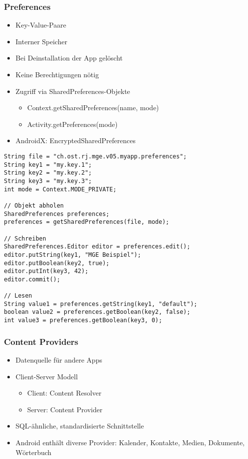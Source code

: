 \subsubsection{Preferences}
\begin{itemize}[topsep=0pt, leftmargin=4mm]
    \setlength\itemsep{-0.3em}
    \item Key-Value-Paare
    \item Interner Speicher
    \item Bei Deinstallation der App gelöscht
    \item Keine Berechtigungen nötig
    \item Zugriff via SharedPreferences-Objekte
    \begin{itemize}[topsep=0pt, leftmargin=4mm]
        \setlength\itemsep{-0.3em}
        \item Context.getSharedPreferences(name, mode)
        \item Activity.getPreferences(mode)
    \end{itemize}
    \item AndroidX: EncryptedSharedPreferences
\end{itemize}
\begin{lstlisting}
String file = "ch.ost.rj.mge.v05.myapp.preferences";
String key1 = "my.key.1";
String key2 = "my.key.2";
String key3 = "my.key.3";
int mode = Context.MODE_PRIVATE;

// Objekt abholen
SharedPreferences preferences;
preferences = getSharedPreferences(file, mode);

// Schreiben
SharedPreferences.Editor editor = preferences.edit();
editor.putString(key1, "MGE Beispiel");
editor.putBoolean(key2, true);
editor.putInt(key3, 42);
editor.commit();

// Lesen
String value1 = preferences.getString(key1, "default");
boolean value2 = preferences.getBoolean(key2, false);
int value3 = preferences.getBoolean(key3, 0);
\end{lstlisting}
\subsubsection{Content Providers}
\begin{itemize}[topsep=0pt, leftmargin=4mm]
    \setlength\itemsep{-0.3em}
    \item Datenquelle für andere Apps
    \item Client-Server Modell
    \begin{itemize}[topsep=0pt, leftmargin=4mm]
        \setlength\itemsep{-0.3em}
        \item Client: Content Resolver
        \item Server: Content Provider
    \end{itemize}
    \item SQL-ähnliche, standardisierte Schnittstelle
    \item Android enthält diverse Provider: Kalender, Kontakte, Medien, Dokumente, Wörterbuch
\end{itemize}
